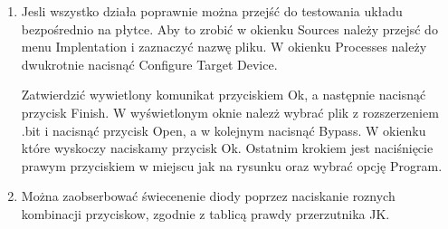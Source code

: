 \documentclass{article}
\begin{document}
\begin{enumerate}
\begin{minipage}[t]{\linewidth}
          \medskip
 \end{minipage}
\item Jesli wszystko działa poprawnie można przejść do testowania układu bezpośrednio na płytce. Aby to zrobić w okienku Sources należy przejsć do menu Implentation i zaznaczyć nazwę pliku. W okienku Processes należy dwukrotnie nacisnąć Configure Target Device.\\ \begin{minipage}[t]{\linewidth}
          \raggedright

          \medskip
Zatwierdzić wywietlony komunikat przyciskiem Ok, a następnie nacisnąć przycisk Finish. W wyświetlonym oknie nalezż wybrać plik z rozszerzeniem .bit i nacisnąć przycisk Open, a w kolejnym nacisnąć Bypass. W okienku które wyskoczy naciskamy przycisk Ok. Ostatnim krokiem jest naciśnięcie prawym przyciskiem w miejscu jak na rysunku oraz wybrać opcję Program.
 \end{minipage}
\item Można zaobserbować świecenenie diody poprzez naciskanie roznych kombinacji przyciskow, zgodnie z tablicą prawdy przerzutnika JK.
\end{enumerate}
\end{document}
